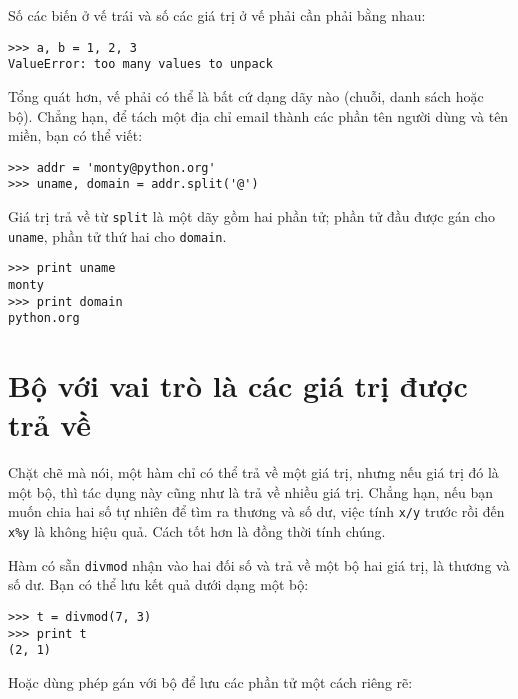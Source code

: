 \documentclass[11pt]{book}
\begin{document}
Số các biến ở vế trái và số các giá trị ở vế phải cần phải
bằng nhau:


\beforeverb
\begin{verbatim}
>>> a, b = 1, 2, 3
ValueError: too many values to unpack
\end{verbatim}
\afterverb
%
Tổng quát hơn, vế phải có thể là bất cứ dạng dãy nào (chuỗi,
danh sách hoặc bộ). Chẳng hạn, để tách một địa chỉ email thành
các phần tên người dùng và tên miền, bạn có thể viết:


\beforeverb
\begin{verbatim}
>>> addr = 'monty@python.org'
>>> uname, domain = addr.split('@')
\end{verbatim}
\afterverb
%
Giá trị trả về từ {\tt split} là một dãy gồm hai phần tử;
phần tử đầu được gán cho {\tt uname}, phần tử thứ hai cho
{\tt domain}.

\beforeverb
\begin{verbatim}
>>> print uname
monty
>>> print domain
python.org
\end{verbatim}
\afterverb
%

\section{Bộ với vai trò là các giá trị được trả về}


Chặt chẽ mà nói, một hàm chỉ có thể trả về một giá trị, nhưng
nếu giá trị đó là một bộ, thì tác dụng này cũng như là trả về
nhiều giá trị. Chẳng hạn, nếu bạn muốn chia hai số tự nhiên để
tìm ra thương và số dư, việc tính {\tt x/y} trước rồi đến {\tt x\%y}
là không hiệu quả. Cách tốt hơn là đồng thời tính chúng.


Hàm có sẵn {\tt divmod} nhận vào hai đối số và trả về
một bộ hai giá trị, là thương và số dư. Bạn có thể lưu kết quả
dưới dạng một bộ:

\beforeverb
\begin{verbatim}
>>> t = divmod(7, 3)
>>> print t
(2, 1)
\end{verbatim}
\afterverb
%
Hoặc dùng phép gán với bộ để lưu các phần tử một cách riêng rẽ:

\end{document}
